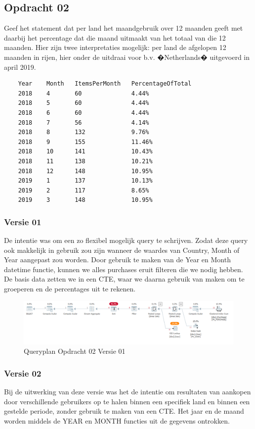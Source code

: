 \subsection{Opdracht 02}
Geef het statement dat per land het maandgebruik over 12 maanden geeft met daarbij het percentage dat die maand uitmaakt van het totaal van die 12 maanden.
Hier zijn twee interpretaties mogelijk: per land de afgelopen 12 maanden in rijen, hier onder de uitdraai voor b.v. �Netherlands� uitgevoerd in april 2019.

\begin{lstlisting}
    Year	Month	ItemsPerMonth	PercentageOfTotal
    2018	4	    60		        4.44%
    2018	5	    60		        4.44%
    2018	6	    60		        4.44%
    2018	7	    56		        4.14%
    2018	8	    132		        9.76%
    2018	9	    155		        11.46%
    2018	10	    141		        10.43%
    2018	11	    138		        10.21%
    2018	12	    148		        10.95%
    2019	1	    137		        10.13%
    2019	2	    117		        8.65%
    2019	3	    148		        10.95%
\end{lstlisting}

\subsubsection{Versie 01}
De intentie was om een zo flexibel mogelijk query te schrijven. Zodat deze query ook makkelijk in gebruik
zou zijn wanneer de waardes van Country, Month of Year aangepast zou worden. Door gebruik te maken van de
Year en Month datetime functie, kunnen we alles purchases eruit filteren die we nodig hebben.
De basis data zetten we in een CTE, waar we daarna gebruik van maken om te groeperen en de percentages uit te rekenen.



\begin{figure}[H]
    \centering
    \includegraphics[width=1\textwidth]{image/nick/opdracht-02a.PNG}
    \caption{Queryplan Opdracht 02 Versie 01}
\end{figure}

\subsubsection{Versie 02}
    Bij de uitwerking van deze versie was het de intentie om resultaten van aankopen door verschillende gebruikers
    op te halen binnen een specifiek land en binnen een gestelde periode, zonder gebruik te maken van een CTE. Het jaar en de maand
    worden middels de YEAR en MONTH functies uit de gegevens ontrokken.

